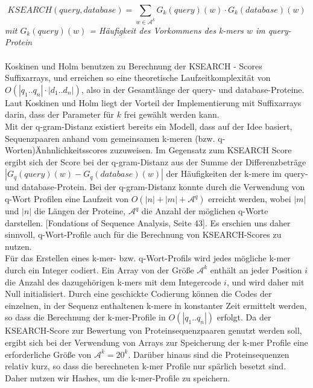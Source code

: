 \documentclass{article}
\begin{document}
\begin{equation}
KSEARCH(query,database) = \sum_{w \in \mathcal A^k} G_k(query)(w) \cdot G_k(database)(w)
\end{equation}  
\textit{mit $G_k(query)(w)$ = Häufigkeit des Vorkommens des k-mers $w$ im query-Protein}\\ \\

Koskinen und Holm benutzen zu Berechnung der KSEARCH - Scores Suffixarrays, und erreichen so eine theoretische Laufzeitkomplexität von $O(|q_1..q_n| \cdot |d_1..d_n|)$, also in der Gesamtlänge der query- und database-Proteine. Laut Koskinen und Holm liegt der Vorteil der Implementierung mit Suffixarrays darin, dass der Parameter für $k$ frei gewählt werden kann. \\
Mit der q-gram-Distanz existiert bereits ein Modell, dass auf der Idee basiert, Sequenzpaaren anhand vom gemeinsamen k-meren (bzw. q-Worten)Änhnlichkeitsscores zuzuweisen. Im Gegensatz zum KSEARCH Score ergibt sich der Score bei der q-gram-Distanz aus der Summe der Differenzbeträge $|G_q(query)(w) - G_q(database)(w)|$ der Häufigkeiten der k-mere im query- und database-Protein. Bei der q-gram-Distanz konnte durch die Verwendung von q-Wort Profilen eine Laufzeit von $O(|n|+|m|+\mathcal{A}^q)$ erreicht werden, wobei $|m|$ und $|n|$ die Längen der Proteine, $\mathcal{A}^q$ die Anzahl der möglichen q-Worte darstellen. [Fondations of Sequence Analysis, Seite 43]. Es erschien uns daher sinnvoll, q-Wort-Profile auch für die Berechnung von KSEARCH-Scores zu nutzen.\\
Für das Erstellen eines k-mer- bzw. q-Wort-Profils wird jedes mögliche k-mer durch ein Integer codiert. Ein Array von der Größe $\mathcal{A}^k$ enthält an jeder Position $i$ die Anzahl des dazugehörigen k-mers mit dem Integercode $i$, und wird daher mit Null initialisiert. Durch eine geschickte Codierung können die Codes der einzelnen, in der Sequenz enthaltenen k-mere in konstanter Zeit ermittelt werden, so dass die Berechnung der k-mer-Profile in ${O(|q_1..q_n|)}$ erfolgt. Da der KSEARCH-Score zur Bewertung von Proteinsequenzpaaren genutzt werden soll, ergibt sich bei der Verwendung von Arrays zur Speicherung der k-mer Profile eine erforderliche Größe von $\mathcal{A}^k = 20^k$. Darüber hinaus sind die Proteinsequenzen relativ kurz, so dass die berechneten k-mer Profile nur spärlich besetzt sind. Daher nutzen wir Hashes, um die k-mer-Profile zu speichern. \\
\end{document}
